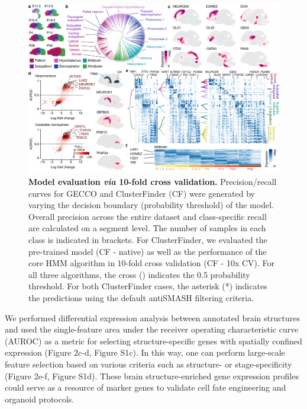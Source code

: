 \begin{figure}[b!]
    \centering
	\includegraphics[width=\textwidth]{figures/voxhunt/Figure_2}
    \caption{\textbf{Model evaluation \textit{via} 10-fold cross validation.} Precision/recall curves for GECCO and ClusterFinder (CF) were generated by varying the decision boundary (probability threshold) of the model. Overall precision across the entire dataset and class-specific recall are calculated on a segment level. The number of samples in each class is indicated in brackets. For ClusterFinder, we evaluated the pre-trained model (CF - native) as well as the performance of the core HMM algorithm in 10-fold cross validation (CF - 10x CV). For all three algorithms, the cross (\texttimes) indicates the 0.5 probability threshold. For both ClusterFinder cases, the asterisk (*) indicates the predictions using the default antiSMASH filtering criteria.}
    \label{fig:vox2}
\end{figure}


We performed differential expression analysis between annotated brain structures and used the single-feature area under the receiver operating characteristic curve (AUROC) as a metric for selecting structure-specific genes with spatially confined expression (Figure 2c-d, Figure S1c). In this way, one can perform large-scale feature selection based on various criteria such as structure- or stage-specificity (Figure 2e-f, Figure S1d). These brain structure-enriched gene expression profiles could serve as a resource of marker genes to validate cell fate engineering and organoid protocols.


